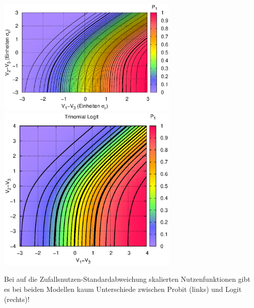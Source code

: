 \documentclass[a4paper]{foils}
\begin{document}
\begin{landscape}
\begin{center}
 \includegraphics[width=0.65\textwidth]{./figsDiscr/p1ProbitTrinom_V1V2.eps}   
 \includegraphics[width=0.65\textwidth]{./figsDiscr/pLogitTrinom_V1V2.eps}   
\vspace{1em}

\parbox{1.1\textwidth}{Bei auf die Zufallsnutzen-Standardabweichung skalierten
  Nutzenfunktionen gibt 
es bei beiden Modellen kaum Unterschiede zwischen Probit (links) und Logit (rechts)!}


\newpage

\vspace{1em}


\end{center}
\end{landscape}
\end{document}
